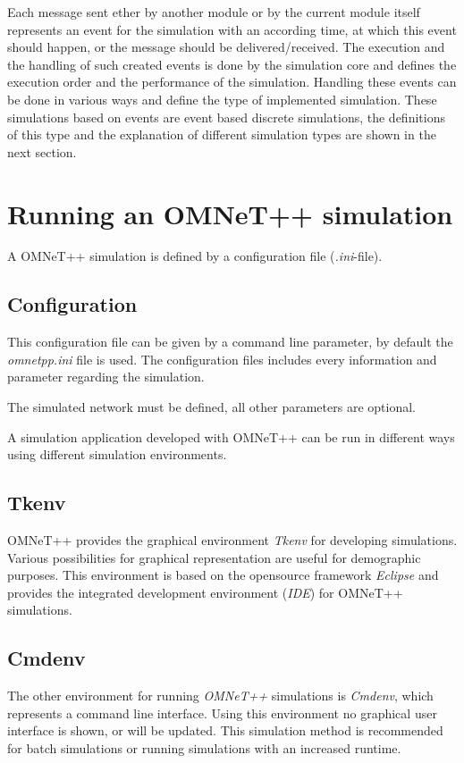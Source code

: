 Each message sent ether by another module or by the current module itself represents an event for the simulation with an according time, at which this event should happen, or the message should be delivered/received.
The execution and the handling of such created events is done by the simulation core and defines the execution order and the performance of the simulation.
Handling these events can be done in various ways and define the type of implemented simulation.
These simulations based on events are event based discrete simulations, the definitions of this type and the explanation of different simulation types are shown in the next section.

\section{Running an OMNeT++ simulation}
A OMNeT++ simulation is defined by a configuration file (\emph{.ini}-file).

\subsection{Configuration}
This configuration file can be given by a command line parameter, by default the \emph{omnetpp.ini} file is used.
The configuration files includes every information and parameter regarding the simulation.

The simulated network must be defined, all other parameters are optional.



A simulation application developed with OMNeT++ can be run in different ways using different simulation environments.

\subsection{Tkenv}
OMNeT++ provides the graphical environment \emph{Tkenv} for developing simulations.
Various possibilities for graphical representation are useful for demographic purposes.
This environment is based on the opensource framework \emph{Eclipse} and provides the integrated development environment (\emph{IDE}) for OMNeT++ simulations.

\subsection{Cmdenv}
The other environment for running \emph{OMNeT++} simulations is \emph{Cmdenv}, which represents a command line interface.
Using this environment no graphical user interface is shown, or will be updated.
This simulation method is recommended for batch simulations or running simulations with an increased runtime.